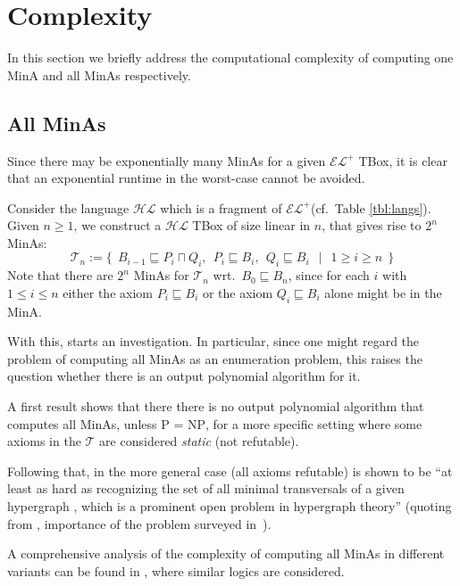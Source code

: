 \documentclass{llncs}
\newcommand{\elp}{\ensuremath{\mathcal{EL^+}}\xspace}
\newcommand{\hl}{\ensuremath{\mathcal{HL}}\xspace}
\newcommand{\tb}{\ensuremath{\mathcal{T}}\xspace} %
\newcommand{\subsume}{\sqsubseteq}
\begin{document}
\section{Complexity}
\label{sec:cmplx}

In this section we briefly address the computational complexity of computing one MinA and all MinAs respectively.

\subsection{All MinAs}
\label{sec:all}

Since there may be exponentially many MinAs for a given \elp TBox, it is clear that an exponential runtime in the worst-case cannot be avoided.

\begin{example}
Consider the language \hl which is a fragment of \elp (cf.~Table \ref{tbl:langs}). Given $n \geq 1$, we construct a \hl TBox of size linear in $n$, that gives rise to $2^n$ MinAs: $$\tb_n := \big\{~~B_{i-1} \subsume P_i \sqcap Q_i,~~P_i \subsume B_i,~~Q_i \subsume B_i~~\mid~~1 \geq i \geq n~~\big\}$$ Note that there are $2^n$ MinAs for $\tb_n$ wrt.~$B_0 \subsume B_n$, since for each $i$ with $1 \leq i \leq n$ either the axiom $P_i \subsume B_i$ or the axiom $Q_i \subsume B_i$ alone might be in the MinA.
\end{example}

With this, \cite{orig1,orig2} starts an investigation. In particular, since one might regard the problem of computing all MinAs as an enumeration problem, this raises the question whether there is an output polynomial algorithm for it.

A first result \cite[Thm.~5]{orig1,orig2} shows that there there is no output polynomial algorithm that computes all MinAs, unless \textsc{P} = \textsc{NP}, for a more specific setting where some axioms in the \tb are considered \emph{static} (not refutable).

Following that, in \cite[Thm.~2]{hard} the more general case (all axioms refutable) is shown to be \enquote{at least as hard as recognizing the set of all minimal transversals of a given hypergraph \cite{hypmintrav}, which is a prominent open problem in hypergraph theory} (quoting from \cite{hard}, importance of the problem surveyed in~\cite{hyperai}).

A comprehensive analysis of the complexity of computing all MinAs in different variants can be found in \cite{family}, where similar logics are considered.
\end{document}
